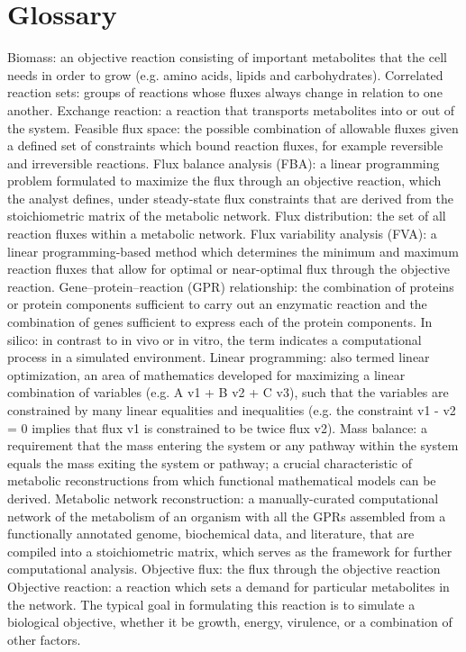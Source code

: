 \section{Glossary}
Biomass: an objective reaction consisting of important metabolites that the cell needs in order to grow (e.g. amino acids, lipids and carbohydrates). Correlated reaction sets: groups of reactions whose fluxes always change in relation to one another.
Exchange reaction: a reaction that transports metabolites into or out of the system.
Feasible flux space: the possible combination of allowable fluxes given a defined set of constraints which bound reaction fluxes, for example reversible and irreversible reactions.
Flux balance analysis (FBA): a linear programming problem formulated to maximize the flux through an objective reaction, which the analyst defines, under steady-state flux constraints that are derived from the stoichiometric matrix of the metabolic network.
Flux distribution: the set of all reaction fluxes within a metabolic network.
Flux variability analysis (FVA): a linear programming-based method which determines the minimum and maximum reaction fluxes that allow for optimal or near-optimal flux through the objective reaction.
Gene–protein–reaction (GPR) relationship: the combination of proteins or protein components sufficient to carry out an enzymatic reaction and the combination of genes sufficient to express each of the protein components.
In silico: in contrast to in vivo or in vitro, the term indicates a computational process in a simulated environment.
Linear programming: also termed linear optimization, an area of mathematics developed for maximizing a linear combination of variables (e.g. A v1 + B v2 + C v3), such that the variables are constrained by many linear equalities and inequalities (e.g. the constraint v1 - v2 = 0 implies that flux v1 is constrained to be twice flux v2).
Mass balance: a requirement that the mass entering the system or any pathway within the system equals the mass exiting the system or pathway; a crucial characteristic of metabolic reconstructions from which functional mathematical models can be derived.
Metabolic network reconstruction: a manually-curated computational network of the metabolism of an organism with all the GPRs assembled from a functionally annotated genome, biochemical data, and literature, that are compiled into a stoichiometric matrix, which serves as the framework for further computational analysis.
Objective flux: the flux through the objective reaction
Objective reaction: a reaction which sets a demand for particular metabolites in the network. The typical goal in formulating this reaction is to simulate a biological objective, whether it be growth, energy, virulence, or a combination of other factors.
